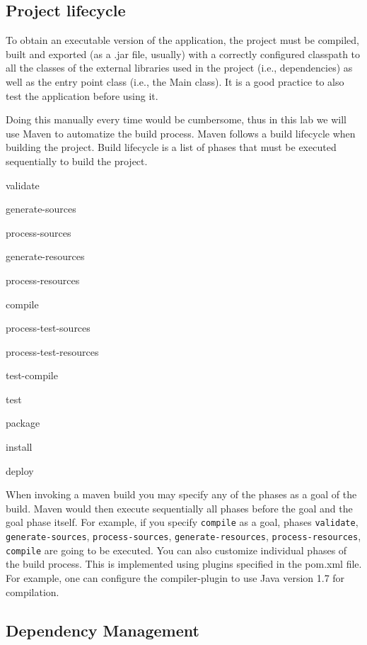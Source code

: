 \documentclass{article}
\begin{document}
\subsection{Project lifecycle}

To obtain an executable version of the application, the project must be
compiled, built and exported (as a .jar file, usually) with a
correctly configured classpath to all the classes of the
external libraries used in the project (i.e., dependencies) as well 
as the entry point class (i.e., the Main class). It is a
good practice to also test the application before using it.

Doing this manually every time would be cumbersome, thus in this
lab we will use Maven to automatize the build process.
Maven follows a build lifecycle when building the project. Build
lifecycle is a list of phases that must be executed sequentially to
build the project.

\begin{compactitem}
\item validate
\item generate-sources
\item process-sources
\item generate-resources
\item process-resources
\item compile
\item process-test-sources
\item process-test-resources
\item test-compile
\item test
\item package
\item install
\item deploy
\end{compactitem}

When invoking a maven build you may specify any of the phases as a
goal of the build. Maven would then execute sequentially all phases
before the goal and the goal phase itself. For example, if you specify
\texttt{compile} as a goal, phases \texttt{validate},
\texttt{generate-sources}, \texttt{process-sources},
\texttt{generate-resources}, \texttt{process-resources},
\texttt{compile} are going to be executed.
You can also customize individual phases of the build process. This is
implemented using plugins specified in the pom.xml file. For example,
one can configure the compiler-plugin to use Java version 1.7 for
compilation.

\subsection{Dependency Management}
\end{document}

